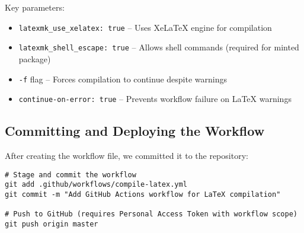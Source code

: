 Key parameters:
\begin{itemize}
    \item \texttt{latexmk\_use\_xelatex: true} -- Uses XeLaTeX engine for compilation
    \item \texttt{latexmk\_shell\_escape: true} -- Allows shell commands (required for minted package)
    \item \texttt{-f} flag -- Forces compilation to continue despite warnings
    \item \texttt{continue-on-error: true} -- Prevents workflow failure on LaTeX warnings
\end{itemize}

\subsection{Committing and Deploying the Workflow}

After creating the workflow file, we committed it to the repository:

\begin{verbatim}
# Stage and commit the workflow
git add .github/workflows/compile-latex.yml
git commit -m "Add GitHub Actions workflow for LaTeX compilation"

# Push to GitHub (requires Personal Access Token with workflow scope)
git push origin master
\end{verbatim}




